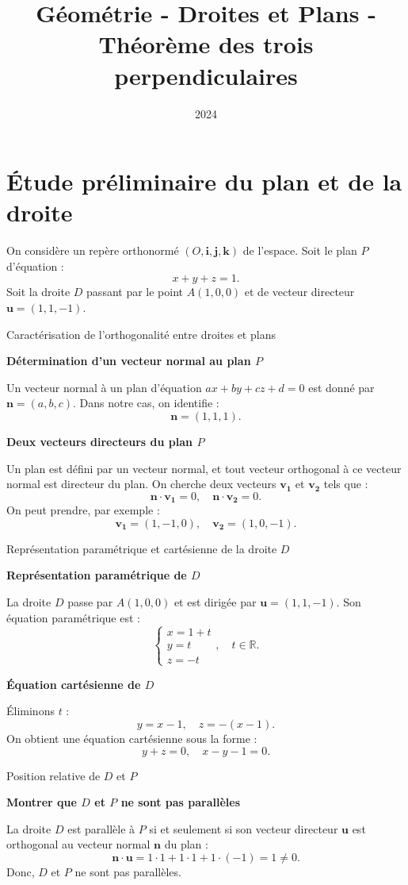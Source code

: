 \documentclass[10pt,a4paper]{article}
\title{Géométrie - Droites et Plans - Théorème des trois perpendiculaires}
\author{}
\date{2024}
\begin{document}
\section{Étude préliminaire du plan et de la droite}

On considère un repère orthonormé $(O, \mathbf{i}, \mathbf{j}, \mathbf{k})$ de l'espace. Soit le
plan $P$ d'équation :
   \[
   x + y + z = 1.
   \]
Soit la droite $D$ passant par le point $A(1, 0, 0)$ et de vecteur directeur $\mathbf{u} =
(1,1,-1)$.

\q Caractérisation de l'orthogonalité entre droites et plans
\setcounter{ql}{0}

\ql \textbf{Détermination d'un vecteur normal au plan $P$}

Un vecteur normal à un plan d'équation $ax + by + cz + d = 0$ est donné par $\mathbf{n} = (a, b,
c)$. Dans notre cas, on identifie :
\[
\mathbf{n} = (1,1,1).
\]

\ql \textbf{Deux vecteurs directeurs du plan $P$}

Un plan est défini par un vecteur normal, et tout vecteur orthogonal à ce vecteur normal est
directeur du plan. On cherche deux vecteurs $\mathbf{v_1}$ et $\mathbf{v_2}$ tels que :
\[
\mathbf{n} \cdot \mathbf{v_1} = 0, \quad \mathbf{n} \cdot \mathbf{v_2} = 0.
\]
On peut prendre, par exemple :
\[
\mathbf{v_1} = (1,-1,0), \quad \mathbf{v_2} = (1,0,-1).
\]

\q Représentation paramétrique et cartésienne de la droite $D$
\setcounter{ql}{0}

\ql \textbf{Représentation paramétrique de $D$}

La droite $D$ passe par $A(1,0,0)$ et est dirigée par $\mathbf{u} = (1,1,-1)$. Son équation
paramétrique est :
\[
\begin{cases}
x = 1 + t \\
y = t \\
z = -t
\end{cases}, \quad t \in \mathbb{R}.
\]

\ql \textbf{Équation cartésienne de $D$}

Éliminons $t$ :
\[
y = x - 1, \quad z = - (x - 1).
\]
On obtient une équation cartésienne sous la forme :
\[
y + z = 0, \quad x - y - 1 = 0.
\]

\q Position relative de $D$ et $P$
\setcounter{ql}{0}

\ql \textbf{Montrer que $D$ et $P$ ne sont pas parallèles}

La droite $D$ est parallèle à $P$ si et seulement si son vecteur directeur $\mathbf{u}$ est
orthogonal au vecteur normal $\mathbf{n}$ du plan :
\[
\mathbf{n} \cdot \mathbf{u} = 1 \cdot 1 + 1 \cdot 1 + 1 \cdot (-1) = 1 \neq 0.
\]
Donc, $D$ et $P$ ne sont pas parallèles.
\end{document}
